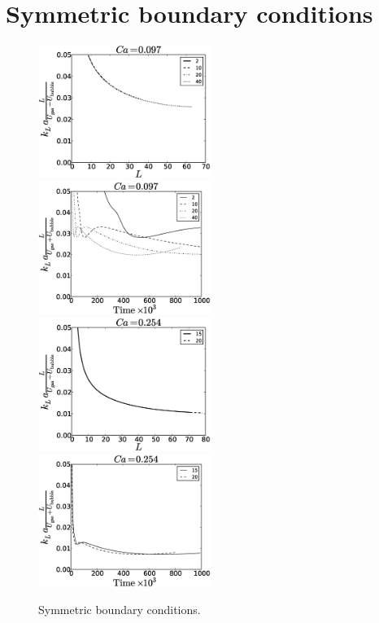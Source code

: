 \documentclass{article}
\begin{document}
\section{Symmetric boundary conditions}
\begin{figure}
\includegraphics[width=0.5\textwidth]{Figures/sym_aver_conc_scale_ca0097.eps}
\includegraphics[width=0.5\textwidth]{Figures/sym_aver_moving_window_ca0097.eps}\\
\includegraphics[width=0.5\textwidth]{Figures/sym_aver_conc_scale_ca0254.eps}
\includegraphics[width=0.5\textwidth]{Figures/sym_aver_moving_window_ca0254.eps}\\
\caption{Symmetric boundary conditions. \label{fig:open:boundary:sym}}
\end{figure}
\end{document}
